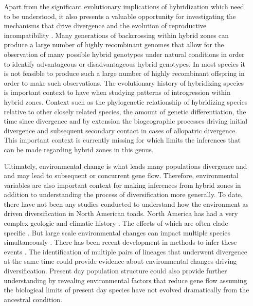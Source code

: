 Apart from the significant evolutionary implications of hybridization which 
need to be understood, it also presents a valuable opportunity for investigating 
the mechanisms that drive divergence and the evolution of reproductive
incompatibility \parencite{rieseberg1999}. 
Many generations of backcrossing within hybrid zones can produce a large number
of highly recombinant genomes that allow for the observation of many possible 
hybrid genotypes under natural conditions in order to identify advantageous or
disadvantageous hybrid genotypes. 
In most species it is not feasible to produce such a large number of highly  
recombinant offspring in order to make such observations.
The evolutionary history of hybridizing species is important context to have 
when studying patterns of introgression within hybrid zones. 
Context such as the phylogenetic relationship of hybridizing species relative to
other closely related species, the amount of genetic differentiation, 
the time since divergence and by extension the biogeographic 
processes driving initial divergence and subsequent secondary contact in cases 
of allopatric divergence.
This important context is currently missing for \anaxyrus which limits the
inferences that can be made regarding hybrid zones in this genus. 


Ultimately, environmental change is what leads many populations divergence and 
and may lead to subsequent or concurrent gene flow.
Therefore, environmental variables are also important context for making 
inferences from hybrid zones in addition to understanding the process of 
diversification more generally.
To date, there have not been any studies conducted to understand how the 
environment as driven diversification in North American toads. 
North America has had a very complex geologic and climatic history \parencite{lyman2022}.
The effects of which are often clade specific \parencite{nunez2023}.
But large scale environmental changes can impact multiple species simultaneously \parencite{oaks2019}.
There has been recent development in methods to infer these events \parencite{oaks2019,oaks2022}. %
The identification of multiple pairs of lineages that underwent divergence at 
the same time could provide evidence about environmental changes driving 
diversification. %
Present day population structure could also provide further understanding by 
revealing environmental factors that reduce gene flow assuming the biological 
limits of present day species have not evolved dramatically from the ancestral 
condition.

